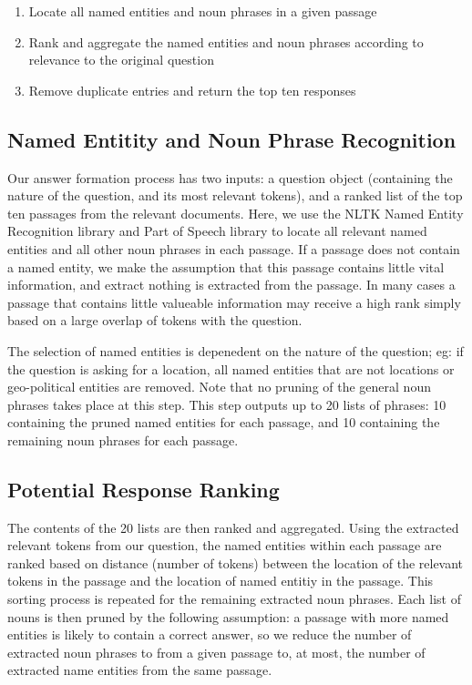 \documentclass{article}
\begin{document}
\begin{enumerate}
\item Locate all named entities and noun phrases in a given passage
\item Rank and aggregate the named entities and noun phrases according to relevance to the original question
\item Remove duplicate entries and return the top ten responses
\end{enumerate}

\subsection{Named Entitity and Noun Phrase Recognition}
Our answer formation process has two inputs: a question object (containing the nature of the question, and its most relevant tokens), and a ranked list of the top ten passages from the relevant documents. Here, we use the NLTK Named Entity Recognition library and Part of Speech library to locate all relevant named entities and all other noun phrases in each passage. If a passage does not contain a named entity, we make the assumption that this passage contains little vital information, and extract nothing is extracted from the passage. In many cases a passage that contains little valueable information may receive a high rank simply based on a large overlap of tokens with the question.

The selection of named entities is depenedent on the nature of the question; eg: if the question is asking for a location, all named entities that are not locations or geo-political entities are removed. Note that no pruning of the general noun phrases takes place at this step. This step outputs up to 20 lists of phrases: 10 containing the pruned named entities for each passage, and 10 containing the remaining noun phrases for each passage.

\subsection{Potential Response Ranking}
The contents of the 20 lists are then ranked and aggregated. Using the extracted relevant tokens from our question, the named entities within each passage are ranked based on distance (number of tokens) between the location of the relevant tokens in the passage and the location of named entitiy in the passage. This sorting process is repeated for the remaining extracted noun phrases. Each list of nouns is then pruned by the following assumption: a passage with more named entities is likely to contain a correct answer, so we reduce the number of extracted noun phrases to from a given passage to, at most, the number of extracted name entities from the same passage. 
\end{document}
